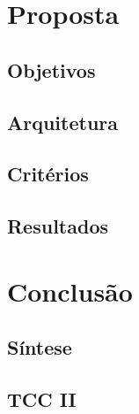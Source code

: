 \documentclass{iiufrgs}
\begin{document}
\newpage

\chapter{Proposta}
\section{Objetivos}
\section{Arquitetura}
\section{Critérios}
\section{Resultados}
\chapter{Conclusão}
\section{Síntese}
\section{TCC II}
\end{document}
